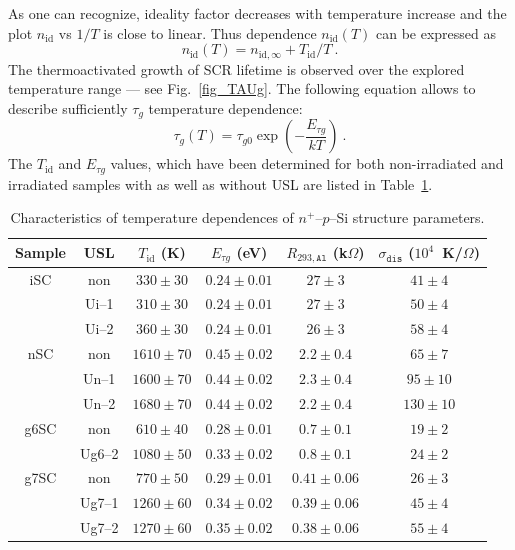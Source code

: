 \documentclass[aip,jap, amsmath,amssymb,reprint]{revtex4-1}
\begin{document}
As one can recognize, ideality factor decreases with temperature increase and the plot $n_{\mathrm{id}}$ vs $1/T$  is close to linear.
Thus dependence $n_{\mathrm{id}}(T)$ can be expressed as
\begin{equation}
\label{eq_nT}
    n_{\mathrm{id}}(T)=n_{\mathrm{id},\infty}+T_{\mathrm{id}}/T\:.
\end{equation}
The thermoactivated growth of SCR lifetime is observed over the explored temperature range --- see Fig.~\ref{fig_TAUg}.
The following equation allows to describe sufficiently $\tau_{g}$ temperature dependence:
\begin{equation}
\label{eq_TAUgT}
    \tau_{g}(T)=\tau_{g0}\exp\left(-\frac{E_{\tau g}}{kT}\right)\:.
\end{equation}
The $T_{\mathrm{id}}$ and $E_{\tau g}$ values, which have been determined for both non-irradiated and irradiated samples with as well as without USL are listed in Table~\ref{tabTpar}.

\begin{table}
\caption{\label{tabTpar}Characteristics of temperature dependences of $n^+$--$p$--Si structure parameters.
}
\begin{ruledtabular}
\begin{tabular}{cccccc}
Sample&USL&$T_{\mathrm{id}}$ (K)&$E_{\tau g}$ (eV)&$R_{293,\mathtt{Al}}$ (k$\Omega$)&$\sigma_{\mathtt{dis}}$ ($10^4$~K/$\Omega$)\\
\hline
iSC&non&$330\pm30$&$0.24\pm0.01$&$27\pm3$&$41\pm4$\\
&Ui--1&$310\pm30$&$0.24\pm0.01$&$27\pm3$&$50\pm4$\\
&Ui--2&$360\pm30$&$0.24\pm0.01$&$26\pm3$&$58\pm4$\\
nSC&non&$1610\pm70$&$0.45\pm0.02$&$2.2\pm0.4$&$65\pm7$\\
&Un--1&$1600\pm70$&$0.44\pm0.02$&$2.3\pm0.4$&$95\pm10$\\
&Un--2&$1680\pm70$&$0.44\pm0.02$&$2.2\pm0.4$&$130\pm10$\\
g6SC&non&$610\pm40$&$0.28\pm0.01$&$0.7\pm0.1$&$19\pm2$\\
&Ug6--2&$1080\pm50$&$0.33\pm0.02$&$0.8\pm0.1$&$24\pm2$\\
g7SC&non&$770\pm50$&$0.29\pm0.01$&$0.41\pm0.06$&$26\pm3$\\
&Ug7--1&$1260\pm60$&$0.34\pm0.02$&$0.39\pm0.06$&$45\pm4$\\
&Ug7--2&$1270\pm60$&$0.35\pm0.02$&$0.38\pm0.06$&$55\pm4$\\
\end{tabular}
\end{ruledtabular}
\end{table}
\end{document}

